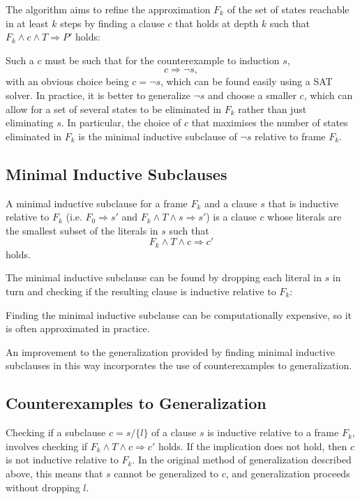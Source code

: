 \documentclass[12pt,a4paper,twoside,openright]{report}
\begin{document}
The algorithm aims to refine the approximation $F_k$ of the set of states
reachable in at least $k$ steps
by finding a clause $c$ that holds at depth $k$ such that
$F_k \wedge c \wedge T \Rightarrow P'$ holds:

Such a $c$ must be such that for the counterexample to induction $s$,
$$c \Rightarrow \neg s,$$
with an obvious choice being $c = \neg s$, which can be found easily using
a SAT solver. In practice, it is better to generalize $\neg s$ and choose
a smaller $c$,
which can allow for a set of several states to be eliminated in $F_k$
rather than just eliminating $s$. In particular, the choice of $c$ that
maximises the number of states eliminated in $F_k$ is the minimal
inductive subclause of $\neg s$ relative to frame $F_k$.

\subsection{Minimal Inductive Subclauses}
A minimal inductive subclause for a frame $F_k$ and a clause $s$ that
is inductive relative to $F_k$
(i.e. $F_0 \Rightarrow s'$ and $F_k \wedge T \wedge s \Rightarrow s'$)
is a clause $c$ whose
literals are the smallest subset of the literals in $s$ such that
$$F_k \wedge T \wedge c \Rightarrow c'$$
holds.

The minimal inductive subclause can be found by dropping each literal
in $s$ in turn and checking if the resulting clause is inductive
relative to $F_k$:

\begin{algorithm}[H]
\DontPrintSemicolon
{}
\end{algorithm}

Finding the minimal inductive subclause can be computationally
expensive, so it is often approximated in practice.

An improvement to the generalization provided by finding minimal
inductive subclauses in this way incorporates the use of counterexamples
to generalization.

\subsection{Counterexamples to Generalization}

Checking if a subclause $c = s / \{l\}$ of a clause $s$ is inductive
relative to a frame $F_k$, involves checking if
$F_k \wedge T \wedge c \Rightarrow c'$ holds.
If the implication does not hold, then $c$ is not inductive relative to
$F_k$. In the original method of generalization described above,
this means that $s$ cannot be generalized to $c$, and generalization
proceeds without dropping $l$.
\end{document}
